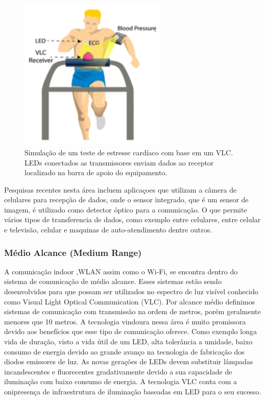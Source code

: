 \begin{figure}
	\centering
		\includegraphics[width = 7cm]{figuras/short}
	\caption{Simulação de um teste de estresse cardíaco com base em um VLC. LEDs conectados as transmissores enviam dados ao receptor localizado na barra de apoio do equipamento.}
	\label{Fig: short}
\end{figure}

Pesquisas recentes nesta área incluem aplicaçoes que utilizam a câmera de celulares para recepção de dados, onde o sensor integrado, que é um sensor de imagem, é utilizado como detector óptico para a comunicação. O que permite vários tipos de transferencia de dados, como exemplo entre celulares, entre celular e televisão, celular e maquinas de auto-atendimento dentre outros.\cite{c.danakism.afganig.poveyiunderwoodh.haas2012}


\subsubsection{Médio Alcance (Medium Range)}

A comunicação indoor ,WLAN assim como o Wi-Fi, se encontra dentro do sistema de comunicação de médio alcance. Esses sistemas estão sendo desenvolvidos para que possam ser utilizados no espectro de luz visível conhecido como Visual Light Optical Communication (VLC). Por alcance médio definimos sistemas de comunicação com transmissão na ordem de metros, porém geralmente menores que 10 metros. A tecnologia vindoura nessa área é muito promissora devido aos benefícios que esse tipo de comunicação oferece. Como exemplo longa vida de duração, visto a vida útil de um LED, alta tolerância a umidade, baixo consumo de energia devido ao grande avanço na tecnologia de fabricação dos diodos emissores de luz.
As novas gerações de LEDs devem substituir lâmpadas incandescentes e fluorecentes gradativamente devido a sua capacidade de iluminação com baixo consumo de energia. A tecnologia VLC conta com a onipresença de infraestrutura de iluminação baseadas em LED para o seu sucesso.

